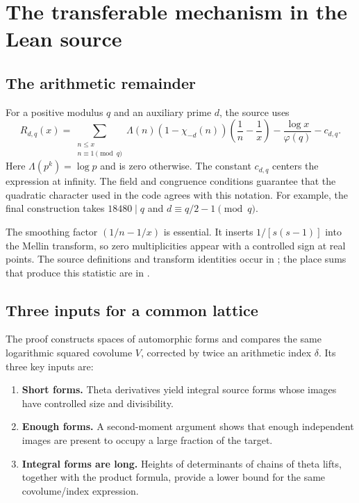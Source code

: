 \section{The transferable mechanism in the Lean source}

\subsection{The arithmetic remainder}

For a positive modulus $q$ and an auxiliary prime $d$, the source uses
\[
 R_{d,q}(x)=
 \sum_{\substack{n\le x\\n\equiv1\pmod q}}
 \Lambda(n)(1-\chi_{-d}(n))
       \left(\frac1n-\frac1x\right)
 -\frac{\log x}{\varphi(q)}-c_{d,q}.
\]
Here $\Lambda(p^k)=\log p$ and is zero otherwise. The constant
$c_{d,q}$ centers the expression at infinity. The field and congruence
conditions guarantee that the quadratic character used in the code
agrees with this notation. For example, the final construction takes
$18480\mid q$ and $d\equiv q/2-1\pmod q$.

The smoothing factor $(1/n-1/x)$ is essential. It inserts
$1/[s(s-1)]$ into the Mellin transform, so zero multiplicities appear
with a controlled sign at real points. The source definitions and
transform identities occur in ;
the place sums that produce this statistic are in
 \cite{repo}.

\subsection{Three inputs for a common lattice}

The proof constructs spaces of automorphic forms and compares the same
logarithmic squared covolume $V$, corrected by twice an arithmetic index
$\delta$. Its three key inputs are:

\begin{enumerate}
\item \textbf{Short forms.} Theta derivatives yield integral source
forms whose images have controlled size and divisibility.
\item \textbf{Enough forms.} A second-moment argument shows that enough
independent images are present to occupy a large fraction of the target.
\item \textbf{Integral forms are long.} Heights of determinants of
chains of theta lifts, together with the product formula, provide a
lower bound for the same covolume/index expression.
\end{enumerate}

